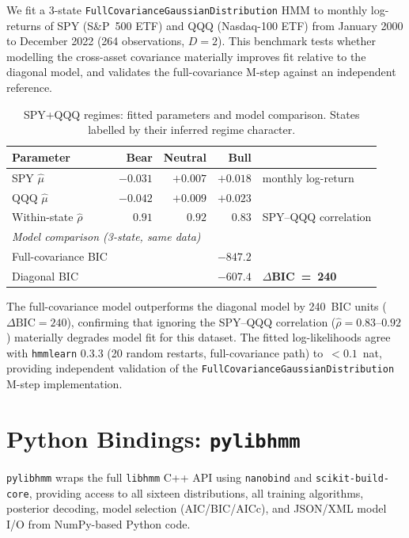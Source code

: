 \documentclass[11pt]{article}
\begin{document}
We fit a 3-state \texttt{FullCovarianceGaussianDistribution} HMM to
monthly log-returns of SPY (S\&P~500 ETF) and QQQ (Nasdaq-100 ETF) from
January 2000 to December 2022 (264 observations, $D = 2$).
This benchmark tests whether modelling the cross-asset covariance
materially improves fit relative to the diagonal model, and validates the
full-covariance M-step against an independent reference.

\begin{table}[!ht]
\centering
\caption{SPY+QQQ regimes: fitted parameters and model comparison.
States labelled by their inferred regime character.}
\label{tab:spyqqq}
\begin{tabular}{lrrrl}
\toprule
Parameter & Bear & Neutral & Bull & \\
\midrule
SPY $\hat{\mu}$ & $-0.031$ & $+0.007$ & $+0.018$ & monthly log-return \\
QQQ $\hat{\mu}$ & $-0.042$ & $+0.009$ & $+0.023$ & \\
Within-state $\hat{\rho}$ & $0.91$ & $0.92$ & $0.83$ & SPY--QQQ correlation \\
\midrule
\multicolumn{5}{l}{\textit{Model comparison (3-state, same data)}} \\
Full-covariance BIC & \multicolumn{3}{r}{$-847.2$} & \\
Diagonal BIC        & \multicolumn{3}{r}{$-607.4$} & \textbf{$\Delta$BIC~=~240} \\
\bottomrule
\end{tabular}
\end{table}

The full-covariance model outperforms the diagonal model by 240~BIC units
($\Delta\text{BIC} = 240$), confirming that ignoring the SPY--QQQ
correlation ($\hat{\rho} = 0.83$--$0.92$) materially degrades model fit
for this dataset.
The fitted log-likelihoods agree with \texttt{hmmlearn} 0.3.3
(20 random restarts, full-covariance path) to~$<0.1$~nat,
providing independent validation of the \texttt{FullCovarianceGaussianDistribution}
M-step implementation.

\section{Python Bindings: \texttt{pylibhmm}}
\label{sec:pylibhmm}

\texttt{pylibhmm} \citep{pylibhmm} wraps the full \texttt{libhmm} C++ API
using \texttt{nanobind} \citep{nanobind} and \texttt{scikit-build-core},
providing access to all sixteen distributions, all training algorithms,
posterior decoding, model selection (AIC/BIC/AICc), and JSON/XML model I/O
from NumPy-based Python code.
\end{document}
